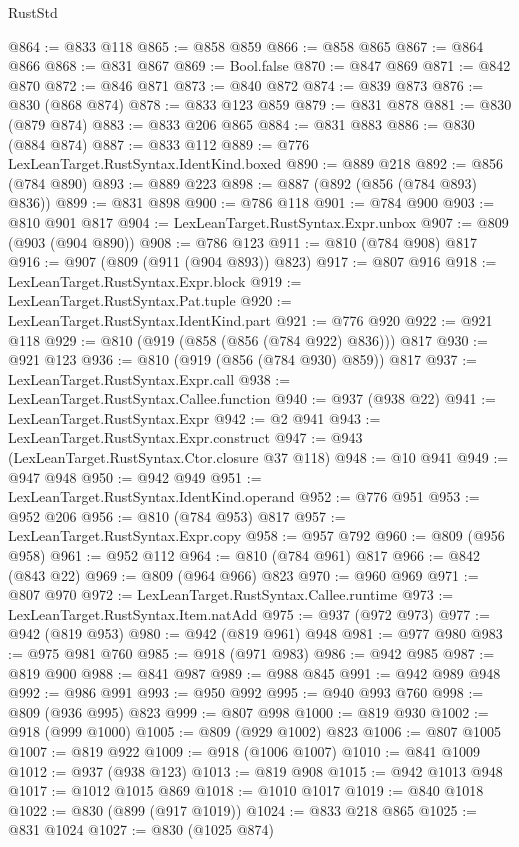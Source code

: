 \begin{lexlean}{RustStd}
\begin{coremodule}
@864 := @833 @118
@865 := @858 @859
@866 := @858 @865
@867 := @864 @866
@868 := @831 @867
@869 := Bool.false
@870 := @847 @869
@871 := @842 @870
@872 := @846 @871
@873 := @840 @872
@874 := @839 @873
@876 := @830 (@868 @874)
@878 := @833 @123 @859
@879 := @831 @878
@881 := @830 (@879 @874)
@883 := @833 @206 @865
@884 := @831 @883
@886 := @830 (@884 @874)
@887 := @833 @112
@889 := @776 LexLeanTarget.RustSyntax.IdentKind.boxed
@890 := @889 @218
@892 := @856 (@784 @890)
@893 := @889 @223
@898 := @887 (@892 (@856 (@784 @893) @836))
@899 := @831 @898
@900 := @786 @118
@901 := @784 @900
@903 := @810 @901 @817
@904 := LexLeanTarget.RustSyntax.Expr.unbox
@907 := @809 (@903 (@904 @890))
@908 := @786 @123
@911 := @810 (@784 @908) @817
@916 := @907 (@809 (@911 (@904 @893)) @823)
@917 := @807 @916
@918 := LexLeanTarget.RustSyntax.Expr.block
@919 := LexLeanTarget.RustSyntax.Pat.tuple
@920 := LexLeanTarget.RustSyntax.IdentKind.part
@921 := @776 @920
@922 := @921 @118
@929 := @810 (@919 (@858 (@856 (@784 @922) @836))) @817
@930 := @921 @123
@936 := @810 (@919 (@856 (@784 @930) @859)) @817
@937 := LexLeanTarget.RustSyntax.Expr.call
@938 := LexLeanTarget.RustSyntax.Callee.function
@940 := @937 (@938 @22)
@941 := LexLeanTarget.RustSyntax.Expr
@942 := @2 @941
@943 := LexLeanTarget.RustSyntax.Expr.construct
@947 := @943 (LexLeanTarget.RustSyntax.Ctor.closure @37 @118)
@948 := @10 @941
@949 := @947 @948
@950 := @942 @949
@951 := LexLeanTarget.RustSyntax.IdentKind.operand
@952 := @776 @951
@953 := @952 @206
@956 := @810 (@784 @953) @817
@957 := LexLeanTarget.RustSyntax.Expr.copy
@958 := @957 @792
@960 := @809 (@956 @958)
@961 := @952 @112
@964 := @810 (@784 @961) @817
@966 := @842 (@843 @22)
@969 := @809 (@964 @966) @823
@970 := @960 @969
@971 := @807 @970
@972 := LexLeanTarget.RustSyntax.Callee.runtime
@973 := LexLeanTarget.RustSyntax.Item.natAdd
@975 := @937 (@972 @973)
@977 := @942 (@819 @953)
@980 := @942 (@819 @961) @948
@981 := @977 @980
@983 := @975 @981 @760
@985 := @918 (@971 @983)
@986 := @942 @985
@987 := @819 @900
@988 := @841 @987
@989 := @988 @845
@991 := @942 @989 @948
@992 := @986 @991
@993 := @950 @992
@995 := @940 @993 @760
@998 := @809 (@936 @995) @823
@999 := @807 @998
@1000 := @819 @930
@1002 := @918 (@999 @1000)
@1005 := @809 (@929 @1002) @823
@1006 := @807 @1005
@1007 := @819 @922
@1009 := @918 (@1006 @1007)
@1010 := @841 @1009
@1012 := @937 (@938 @123)
@1013 := @819 @908
@1015 := @942 @1013 @948
@1017 := @1012 @1015 @869
@1018 := @1010 @1017
@1019 := @840 @1018
@1022 := @830 (@899 (@917 @1019))
@1024 := @833 @218 @865
@1025 := @831 @1024
@1027 := @830 (@1025 @874)

\end{coremodule}
\end{lexlean}
